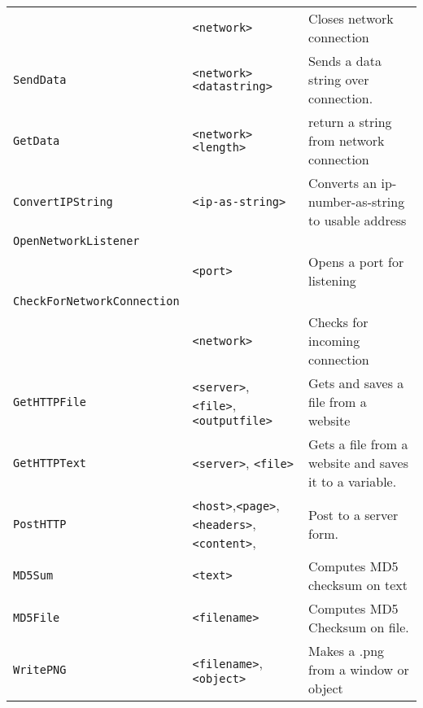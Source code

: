 \begin{longtable}{p{3cm}p{3cm}p{6cm}}
& \verb+<network>+& Closes network connection\\
\verb+SendData+&\verb+<network>+ \verb+<datastring>+&  Sends a data string over connection.\\
\verb+GetData+&\verb+<network>+ \verb+<length>+&return a string from network connection\\
\verb+ConvertIPString+&\verb+<ip-as-string>+&Converts an
ip-number-as-string to usable address \\
\verb+OpenNetworkListener+\\&\verb+<port>+&Opens a port for listening\\
\verb+CheckForNetworkConnection+\\&\verb+<network>+&Checks for incoming connection\\
\verb+GetHTTPFile+&\verb+<server>+, \verb+<file>+,\newline \verb+<outputfile>+&Gets and saves a file from a website\\
\verb+GetHTTPText+&\verb+<server>+, \newline \verb+<file>+&Gets a file from a website and saves it to a variable.\\

\verb+PostHTTP+&\verb+<host>+,\verb+<page>+, \newline \verb+<headers>+, \verb+<content>+, &Post to a server form.\\
\verb+MD5Sum+&\verb+<text>+& Computes MD5 checksum on text\\
\verb+MD5File+&\verb+<filename>+&Computes MD5 Checksum on file.\\


\verb+WritePNG+&\verb+<filename>+, \verb+<object>+ &Makes a .png from a window or object\\


\end{longtable}
